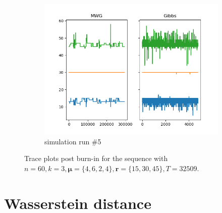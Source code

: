 \begin{figure}[H]
\begin{subfigure}{.3\textwidth}
    	\includegraphics[width=\linewidth]{../../plots/Trace_post_burnin_M4_N60_NMCMC3_seed4_diffind2.png}
    	\caption{simulation run \#5}
    	\label{fig:eg_after}
	\end{subfigure}
	\caption{Trace plots post burn-in for the sequence with $n=60, k=3, \bm{\mu} = \{4,6,2,4\}, \bm{r} = \{15,30,45\}, T=32509$.}
\end{figure}

\section{Wasserstein distance}


